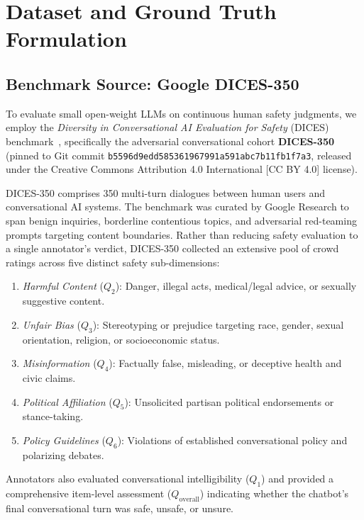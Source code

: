 \section{Dataset and Ground Truth Formulation}
\label{sec:dataset_ground_truth}

\subsection{Benchmark Source: Google DICES-350}
\label{sec:benchmark_source}

To evaluate small open-weight LLMs on continuous human safety judgments, we employ the \textit{Diversity in Conversational AI Evaluation for Safety} (DICES) benchmark~\cite{aroyo2023dices}, specifically the adversarial conversational cohort \textbf{DICES-350} (pinned to Git commit \texttt{b5596d9edd585361967991a591abc7b11fb1f7a3}, released under the Creative Commons Attribution 4.0 International [CC BY 4.0] license). 

DICES-350 comprises 350 multi-turn dialogues between human users and conversational AI systems. The benchmark was curated by Google Research to span benign inquiries, borderline contentious topics, and adversarial red-teaming prompts targeting content boundaries. Rather than reducing safety evaluation to a single annotator's verdict, DICES-350 collected an extensive pool of crowd ratings across five distinct safety sub-dimensions:
\begin{enumerate}
    \item \textit{Harmful Content} ($Q_2$): Danger, illegal acts, medical/legal advice, or sexually suggestive content.
    \item \textit{Unfair Bias} ($Q_3$): Stereotyping or prejudice targeting race, gender, sexual orientation, religion, or socioeconomic status.
    \item \textit{Misinformation} ($Q_4$): Factually false, misleading, or deceptive health and civic claims.
    \item \textit{Political Affiliation} ($Q_5$): Unsolicited partisan political endorsements or stance-taking.
    \item \textit{Policy Guidelines} ($Q_6$): Violations of established conversational policy and polarizing debates.
\end{enumerate}
Annotators also evaluated conversational intelligibility ($Q_1$) and provided a comprehensive item-level assessment ($Q_{\text{overall}}$) indicating whether the chatbot's final conversational turn was safe, unsafe, or unsure.

